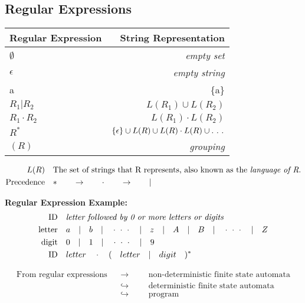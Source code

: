 \documentclass{article}
\begin{document}
\subsection{Regular Expressions}

\begin{tabular}{ l | r }
	\textbf{Regular Expression} & \textbf{String Representation} \\
	\hline
	\hline	
	$\emptyset$ & \textit{empty set} \\
	$\epsilon$ & \textit{empty string} \\
	a & \{a\} \\
	$R_1 | R_2$ & $L(R_1) \cup L(R_2)$ \\
	$R_1 \cdot R_2$ & $L(R_1) \cdot L(R_2)$ \\
	$R^*$ & $\{\epsilon\} \cup L(R) \cup L(R) \cdot L(R) \cup .\ .\ .$ \\
	$(R)$ & \textit{grouping} \\
\end{tabular}

\vspace{1em}
\begin{align*}
L(R) 				&&& \text{The set of strings that R represents, also known as the \textit{language of R}.} \\
\text{Precedence} 	&&& *\qquad\rightarrow\qquad\cdot\qquad\rightarrow\qquad|
\end{align*}

\vspace{1em}
\textbf{Regular Expression Example:}
\begin{align*}
\text{ID} 		&&& \text{\textit{letter followed by 0 or more letters or digits}} \\
\text{letter} 	&&& a\quad | \quad b\quad | \quad \cdot\ \cdot\ \cdot \quad | \quad z\quad | \quad A\quad | \quad B\quad | \quad \cdot\ \cdot\ \cdot\quad | \quad Z \\
\text{digit} 	&&& 0\quad | \quad 1\quad | \quad \cdot\ \cdot\ \cdot \quad | \quad 9 \\
\text{ID} 		&&& letter \quad\cdot\quad (\quad letter\quad | \quad digit\quad)^* \\
\end{align*}

\begin{align*}
\text{From regular expressions}	&&\longrightarrow &&& \text{non-deterministic finite state automata} \\
						 		&&\hookrightarrow &&& \text{deterministic finite state automata} \\
						 		&&\hookrightarrow &&& \text{program} \\
\end{align*}
\end{document}
